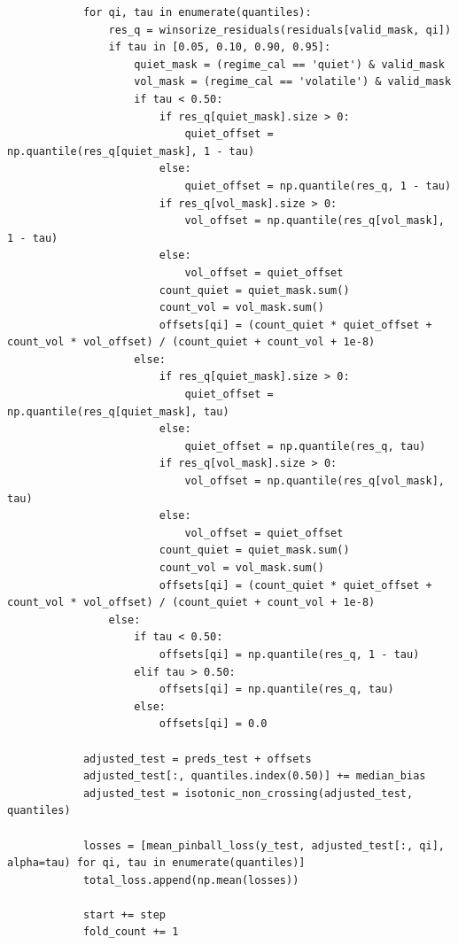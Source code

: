 \documentclass[
  a4paper,
  DIV=11,
  numbers=noendperiod]{scrreprt}
\begin{document}
\begin{verbatim}
            for qi, tau in enumerate(quantiles):
                res_q = winsorize_residuals(residuals[valid_mask, qi])
                if tau in [0.05, 0.10, 0.90, 0.95]:
                    quiet_mask = (regime_cal == 'quiet') & valid_mask
                    vol_mask = (regime_cal == 'volatile') & valid_mask
                    if tau < 0.50:
                        if res_q[quiet_mask].size > 0:
                            quiet_offset = np.quantile(res_q[quiet_mask], 1 - tau)
                        else:
                            quiet_offset = np.quantile(res_q, 1 - tau)
                        if res_q[vol_mask].size > 0:
                            vol_offset = np.quantile(res_q[vol_mask], 1 - tau)
                        else:
                            vol_offset = quiet_offset
                        count_quiet = quiet_mask.sum()
                        count_vol = vol_mask.sum()
                        offsets[qi] = (count_quiet * quiet_offset + count_vol * vol_offset) / (count_quiet + count_vol + 1e-8)
                    else:
                        if res_q[quiet_mask].size > 0:
                            quiet_offset = np.quantile(res_q[quiet_mask], tau)
                        else:
                            quiet_offset = np.quantile(res_q, tau)
                        if res_q[vol_mask].size > 0:
                            vol_offset = np.quantile(res_q[vol_mask], tau)
                        else:
                            vol_offset = quiet_offset
                        count_quiet = quiet_mask.sum()
                        count_vol = vol_mask.sum()
                        offsets[qi] = (count_quiet * quiet_offset + count_vol * vol_offset) / (count_quiet + count_vol + 1e-8)
                else:
                    if tau < 0.50:
                        offsets[qi] = np.quantile(res_q, 1 - tau)
                    elif tau > 0.50:
                        offsets[qi] = np.quantile(res_q, tau)
                    else:
                        offsets[qi] = 0.0

            adjusted_test = preds_test + offsets
            adjusted_test[:, quantiles.index(0.50)] += median_bias
            adjusted_test = isotonic_non_crossing(adjusted_test, quantiles)

            losses = [mean_pinball_loss(y_test, adjusted_test[:, qi], alpha=tau) for qi, tau in enumerate(quantiles)]
            total_loss.append(np.mean(losses))

            start += step
            fold_count += 1


\end{verbatim}
\end{document}
